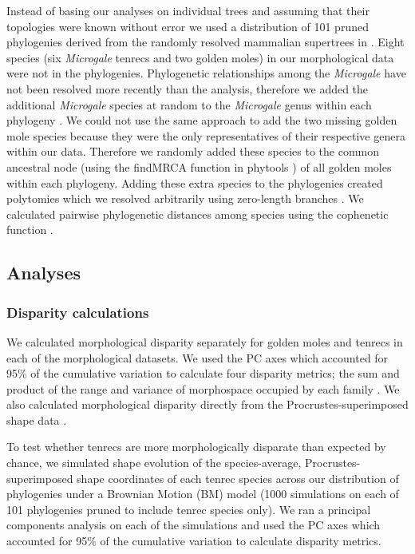 \documentclass[12pt,a4paper]{article}
\begin{document}
Instead of basing our analyses on individual trees and assuming that their topologies were known without error 
\citep[e.g.][]{Ruta2013, Foth2012, Brusatte2008, Harmon2003} we used a distribution of 101 pruned phylogenies derived from the randomly resolved mammalian supertrees in \citep{Kuhn2011}. 
Eight %
species (six \textit{Microgale} tenrecs and two golden moles) in our morphological data were not in the phylogenies. Phylogenetic relationships among the \textit{Microgale} have not been resolved more recently than the \citep{Kuhn2011} analysis, therefore we added the additional \textit{Microgale} species at random to the \textit{Microgale} genus within each phylogeny \citep{Revell2012}. We could not use the same approach to add the two missing golden mole species because they were the only representatives of their respective genera within our data. Therefore we randomly added these species to the common ancestral node (using the findMRCA function in phytools \citep{Revell2012}) of all golden moles within each phylogeny. Adding these extra species to the phylogenies created polytomies which we resolved arbitrarily using zero-length branches \citep{Paradis2004}. We calculated pairwise phylogenetic distances among species using the cophenetic function \citep[R Development Core][]{Team2013}. %

\subsection{Analyses}
\subsubsection{Disparity calculations} 

We calculated morphological disparity separately for golden moles and tenrecs in each of the morphological datasets. We used the PC %
axes which accounted for 95\% of the cumulative variation to calculate four disparity metrics; the sum and product of the range and variance of morphospace occupied by each family \citep{Brusatte2008, Foth2012, Ruta2013}. We also calculated morphological disparity directly from the Procrustes-superimposed shape data \citep{Zelditch2012}. 

To test whether tenrecs are more morphologically disparate than expected by chance, we simulated shape evolution  \citep{Harmon2008} of the species-average, Procrustes-superimposed shape coordinates of each tenrec species across our distribution of phylogenies under a Brownian Motion (BM) model (1000 simulations on each of 101 phylogenies pruned to include tenrec species only). We ran a principal components analysis on each of the simulations and used the PC axes which accounted for 95\% of the cumulative variation to calculate disparity metrics.
 
\end{document}
